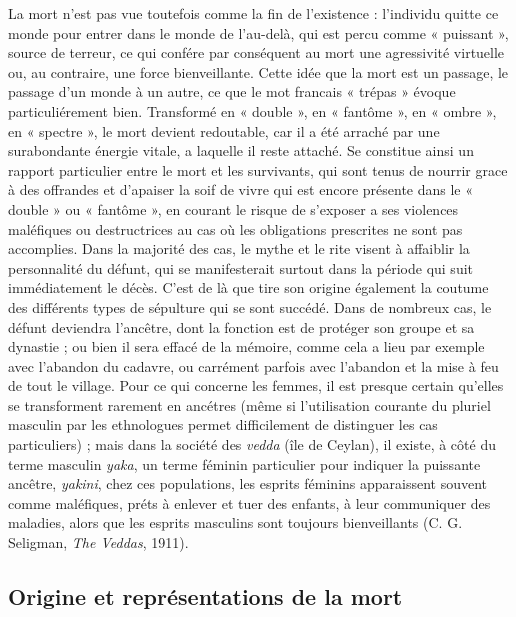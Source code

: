 La mort n'est pas vue toutefois comme la fin de l'existence : l'individu quitte ce monde pour entrer dans le monde de l'au-delà, qui est percu comme « puissant », source de terreur, ce qui confére par conséquent au mort une agressivité virtuelle ou, au contraire, une force bienveillante. Cette idée que la mort est un passage, le passage d'un monde à un autre, ce que le mot francais « trépas » évoque particuliérement bien. Transformé en « double », en « fantôme », en « ombre », en « spectre », le mort devient redoutable, car il a été arraché par une surabondante énergie vitale, a laquelle il reste attaché. Se constitue ainsi un rapport particulier entre le mort et les survivants, qui sont tenus de nourrir grace à des offrandes et d'apaiser la soif de vivre qui est encore présente dans le « double » ou « fantôme », en courant le risque de s'exposer a ses violences maléfiques ou destructrices au cas où les obligations prescrites ne sont pas accomplies. Dans la majorité des cas, le mythe et le rite visent à affaiblir la personnalité du défunt, qui se manifesterait surtout dans la période qui suit immédiatement le décès. C'est de là que tire son origine également la coutume des différents types de sépulture qui se sont succédé. Dans de nombreux cas, le défunt deviendra l'ancêtre, dont la fonction est de protéger son groupe et sa dynastie ; ou bien il sera effacé de la mémoire, comme cela a lieu par exemple avec l'abandon du cadavre, ou carrément parfois avec l'abandon et la mise à feu de tout le village. Pour ce qui concerne les femmes, il est presque certain qu'elles se transforment rarement en ancétres (même si l'utilisation courante du pluriel masculin par les ethnologues permet difficilement de distinguer les cas particuliers) ; mais dans la société des {\it vedda} (île de Ceylan), il existe, à côté du terme masculin {\it yaka}, un terme féminin particulier pour indiquer la puissante ancêtre, {\it yakini}, chez ces populations, les esprits féminins apparaissent souvent comme maléfiques, préts à enlever et tuer des enfants, à leur communiquer des maladies, alors que les esprits masculins sont toujours bienveillants (C. G. Seligman, {\it The Veddas}, 1911).

\subsection{Origine et représentations de la mort}

